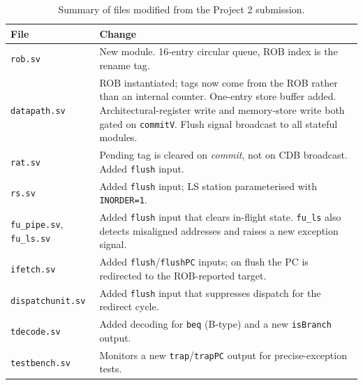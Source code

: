 \documentclass[11pt]{article}
\begin{document}
\begin{table}[h]
  \centering
  \small
  \begin{tabular}{p{3.4cm} p{11.5cm}}
    \toprule
    \textbf{File}                            & \textbf{Change}                                                                                                                              \\
    \midrule
    \texttt{rob.sv}                          & New module. 16-entry circular queue, ROB index is the rename tag.                                                                            \\
    \texttt{datapath.sv}                     & ROB instantiated; tags now come from the ROB rather than an internal counter. One-entry store buffer added.
    Architectural-register write and memory-store write both gated on \texttt{commitV}. Flush signal broadcast to all stateful modules.                                                     \\
    \texttt{rat.sv}                          & Pending tag is cleared on \emph{commit}, not on CDB broadcast. Added \texttt{flush} input.                                                   \\
    \texttt{rs.sv}                           & Added \texttt{flush} input; LS station parameterised with \texttt{INORDER=1}.                                                                \\
    \texttt{fu\_pipe.sv}, \texttt{fu\_ls.sv} & Added \texttt{flush} input that clears in-flight state. \texttt{fu\_ls} also detects misaligned addresses and raises a new exception signal. \\
    \texttt{ifetch.sv}                       & Added \texttt{flush}/\texttt{flushPC} inputs; on flush the PC is redirected to the ROB-reported target.                                      \\
    \texttt{dispatchunit.sv}                 & Added \texttt{flush} input that suppresses dispatch for the redirect cycle.                                                                  \\
    \texttt{tdecode.sv}                      & Added decoding for \texttt{beq} (B-type) and a new \texttt{isBranch} output.                                                                 \\
    \texttt{testbench.sv}                    & Monitors a new \texttt{trap}/\texttt{trapPC} output for precise-exception tests.                                                             \\
    \bottomrule
  \end{tabular}
  \caption{Summary of files modified from the Project 2 submission.}
  \label{tbl:diff}
\end{table}
\end{document}
